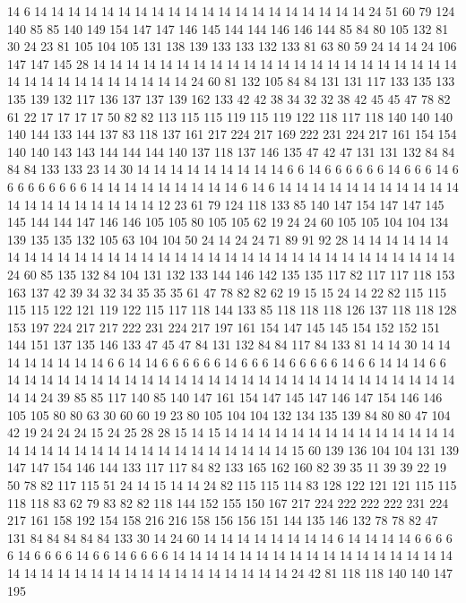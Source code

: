 14 6 14 14 14 14 14 14 14 14 14 14 14 14 14 14 14 14 14 14
14 14 24 51 60 79 124 140 85 85 140 149 154 147 147 146 145 144 144 146
146 144 85 84 80 105 132 81 30 24 23 81 105 104 105 131 138 139 133 133
132 133 81 63 80 59 24 14 14 24 106 147 147 145 28 14 14 14 14 14
14 14 14 14 14 14 14 14 14 14 14 14 14 14 14 14 14 14 14 14
14 14 14 14 14 14 14 14 24 60 81 132 105 84 84 131 131 117 133 135
133 135 139 132 117 136 137 137 139 162 133 42 42 38 34 32 32 38 42 45
45 47 78 82 61 22 17 17 17 17 50 82 82 113 115 115 119 115 119 122
118 117 118 140 140 140 140 144 133 144 137 83 118 137 161 217 224 217 169 222
231 224 217 161 154 154 140 140 143 143 144 144 144 140 137 118 137 146 135 47
42 47 131 131 132 84 84 84 84 133 133 23 14 30 14 14 14 14 14 14
14 14 14 6 6 14 6 6 6 6 6 6 14 6 6 6 14 6 6 6
6 6 6 6 6 6 14 14 14 14 14 14 14 14 14 6 14 6 14 14
14 14 14 14 14 14 14 14 14 14 14 14 14 14 14 14 14 14 12 23
61 79 124 118 133 85 140 147 154 147 147 145 145 144 144 147 146 146 105 105
80 105 105 62 19 24 24 60 105 105 104 104 134 139 135 135 132 105 63 104
104 50 24 14 24 24 71 89 91 92 28 14 14 14 14 14 14 14 14 14
14 14 14 14 14 14 14 14 14 14 14 14 14 14 14 14 14 14 14 14
14 14 14 14 24 60 85 135 132 84 104 131 132 133 144 146 142 135 135 117
82 117 117 118 153 163 137 42 39 34 32 34 35 35 35 61 47 78 82 82
62 19 15 15 24 14 22 82 115 115 115 115 122 121 119 122 115 117 118 144
133 85 118 118 118 126 137 118 118 128 153 197 224 217 217 222 231 224 217 197
161 154 147 145 145 154 152 152 151 144 151 137 135 146 133 47 45 47 84 131
132 84 84 117 84 133 81 14 14 30 14 14 14 14 14 14 14 14 6 6
14 14 6 6 6 6 6 6 14 6 6 6 14 6 6 6 6 6 14 6
6 14 14 14 6 6 14 14 14 14 14 14 14 14 14 14 14 14 14 14
14 14 14 14 14 14 14 14 14 14 14 14 14 14 14 24 39 85 85 117
140 85 140 147 161 154 147 145 147 146 147 154 146 146 105 105 80 80 63 30
60 60 19 23 80 105 104 104 132 134 135 139 84 80 80 47 104 42 19 24
24 24 15 24 25 28 28 15 14 15 14 14 14 14 14 14 14 14 14 14
14 14 14 14 14 14 14 14 14 14 14 14 14 14 14 14 14 14 14 14
14 15 60 139 136 104 104 131 139 147 147 154 146 144 133 117 117 84 82 133
165 162 160 82 39 35 11 39 39 22 19 50 78 82 117 115 51 24 14 15
14 14 24 82 115 115 114 83 128 122 121 121 115 115 118 118 83 62 79 83
82 82 118 144 152 155 150 167 217 224 222 222 222 231 224 217 161 158 192 154
158 216 216 158 156 156 151 144 135 146 132 78 78 82 47 131 84 84 84 84
84 133 30 14 24 60 14 14 14 14 14 14 14 14 6 14 14 14 14 6
6 6 6 6 14 6 6 6 6 14 6 6 14 6 6 6 6 14 14 14
14 14 14 14 14 14 14 14 14 14 14 14 14 14 14 14 14 14 14 14
14 14 14 14 14 14 14 14 14 14 14 24 42 81 118 118 140 140 147 195
